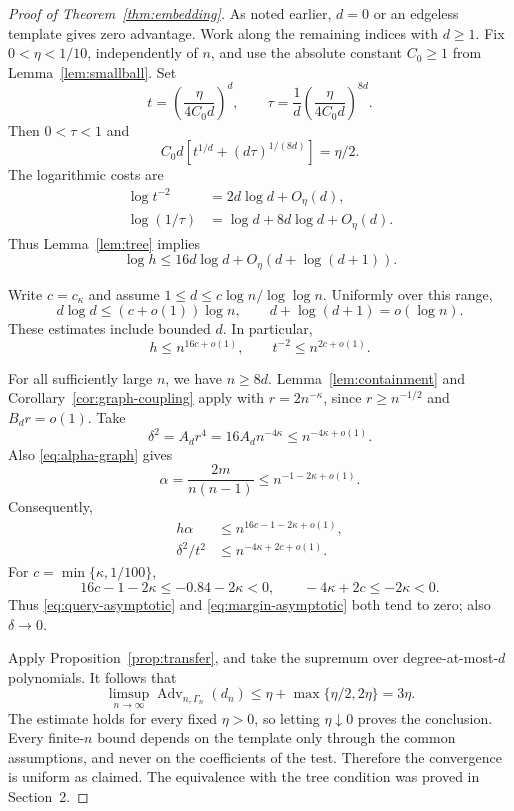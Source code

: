 \documentclass[11pt]{article}
\newcommand{\Adv}{\operatorname{Adv}}
\newcommand{\1}{\mathbf 1}
\theoremstyle{definition}
\theoremstyle{remark}
\numberwithin{equation}{section}
\begin{document}
\begin{proof}[Proof of Theorem~\ref{thm:embedding}]
As noted earlier, $d=0$ or an edgeless template gives zero advantage. Work along the remaining indices with $d\ge1$. Fix $0<\eta<1/10$, independently of $n$, and use the absolute constant $C_0\ge1$ from Lemma~\ref{lem:smallball}. Set
\[
t=\left(\frac{\eta}{4C_0d}\right)^d,
 \qquad
 \tau=\frac1d\left(\frac{\eta}{4C_0d}\right)^{8d}.
\]
Then $0<\tau<1$ and
\[
 C_0d\left[t^{1/d}+(d\tau)^{1/(8d)}\right]=\eta/2.
\]
The logarithmic costs are
\begin{align*}
 \log t^{-2}&=2d\log d+O_\eta(d),\\
 \log(1/\tau)&=\log d+8d\log d+O_\eta(d).
\end{align*}
Thus Lemma~\ref{lem:tree} implies
\[
\log h\le16d\log d+O_\eta(d+\log(d+1)).
\]

Write $c=c_\kappa$ and assume $1\le d\le c\log n/\log\log n$. Uniformly over this range,
\[
 d\log d\le(c+o(1))\log n,
 \qquad d+\log(d+1)=o(\log n).
\]
These estimates include bounded $d$. In particular,
\[
h\le n^{16c+o(1)},\qquad t^{-2}\le n^{2c+o(1)}.
\]

For all sufficiently large $n$, we have $n\ge8d$. Lemma~\ref{lem:containment} and Corollary~\ref{cor:graph-coupling} apply with $r=2n^{-\kappa}$, since $r\ge n^{-1/2}$ and $B_dr=o(1)$. Take
\[
 \delta^2=A_dr^4=16A_dn^{-4\kappa}\le n^{-4\kappa+o(1)}.
\]
Also \eqref{eq:alpha-graph} gives
\[
 \alpha=\frac{2m}{n(n-1)}\le n^{-1-2\kappa+o(1)}.
\]
Consequently,
\begin{align}
 h\alpha&\le n^{16c-1-2\kappa+o(1)},\label{eq:query-asymptotic}\\
 \delta^2/t^2&\le n^{-4\kappa+2c+o(1)}.\label{eq:margin-asymptotic}
\end{align}
For $c=\min\{\kappa,1/100\}$,
\[
 16c-1-2\kappa\le-0.84-2\kappa<0,
 \qquad -4\kappa+2c\le-2\kappa<0.
\]
Thus \eqref{eq:query-asymptotic} and \eqref{eq:margin-asymptotic} both tend to zero; also $\delta\to0$.

Apply Proposition~\ref{prop:transfer}, and take the supremum over degree-at-most-$d$ polynomials. It follows that
\[
 \limsup_{n\to\infty}\Adv_{n,\Gamma_n}(d_n)
 \le\eta+\max\{\eta/2,2\eta\}=3\eta.
\]
The estimate holds for every fixed $\eta>0$, so letting $\eta\downarrow0$ proves the conclusion. Every finite-$n$ bound depends on the template only through the common assumptions, and never on the coefficients of the test. Therefore the convergence is uniform as claimed. The equivalence with the tree condition was proved in Section~2.
\end{proof}
\end{document}
